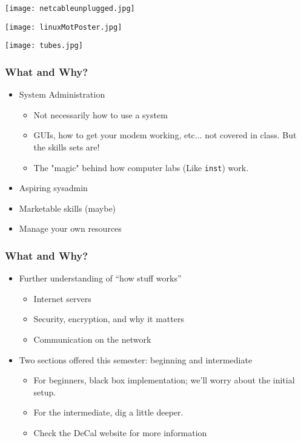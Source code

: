 \documentclass[14pt]{beamer}
\begin{document}
\begin{frame}
  \texttt{[image: netcableunplugged.jpg]}
\end{frame}

\begin{frame}
  \texttt{[image: linuxMotPoster.jpg]}
\end{frame}

\begin{frame}
  \texttt{[image: tubes.jpg]}
\end{frame}

\begin{frame}
	\frametitle{What and Why?}
	\begin{itemize}
		\item System Administration
		\begin{itemize}
			\item Not necessarily how to use a system
			\item GUIs, how to get your modem working, etc... not covered in class. But the skills sets are!
			\item The "magic" behind how computer labs (Like \texttt{inst}) work.
		\end{itemize}
		\item Aspiring sysadmin
		\item Marketable skills (maybe)
		\item Manage your own resources
	\end{itemize}
\end{frame}

\begin{frame}
	\frametitle{What and Why?}
	\begin{itemize}
		\item Further understanding of ``how stuff works''
		\begin{itemize}
			\item Internet servers
			\item Security, encryption, and why it matters
			\item Communication on the network 
		\end{itemize}
		\item Two sections offered this semester: beginning and intermediate
		\begin{itemize}
		\item For beginners, black box implementation; we'll worry about the initial setup.
			\item For the intermediate, dig a little deeper.
		  \item Check the DeCal website for more information
		\end{itemize}
	\end{itemize}
\end{frame}
\end{document}
